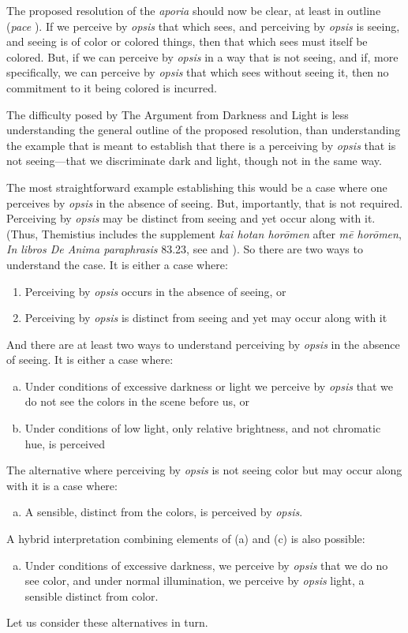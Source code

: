 
The proposed resolution of the \emph{aporia} should now be clear, at least in outline (\emph{pace} \citealt[122]{Hamlyn:2002ys}). If we perceive by \emph{opsis} that which sees, and perceiving by \emph{opsis} is seeing, and seeing is of color or colored things, then that which sees must itself be colored. But, if we can perceive by \emph{opsis} in a way that is not seeing, and if, more specifically, we can perceive by \emph{opsis} that which sees without seeing it, then no commitment to it being colored is incurred.

The difficulty posed by The Argument from Darkness and Light is less understanding the general outline of the proposed resolution, than understanding the example that is meant to establish that there is a perceiving by \emph{opsis} that is not seeing—that we discriminate dark and light, though not in the same way.

The most straightforward example establishing this would be a case where one perceives by \emph{opsis} in the absence of seeing. But, importantly, that is not required. Perceiving by \emph{opsis} may be distinct from seeing and yet occur along with it. (Thus, Themistius includes the supplement \emph{kai hotan horōmen} after \emph{mē horōmen}, \emph{In libros De Anima paraphrasis} 83.23, see \citealt[105, 181 n3]{Todd:1996aa} and \citealt[238]{Browne:1986aa}). So there are two ways to understand the case. It is either a case where:
\begin{enumerate}[(1)]
	\item Perceiving by \emph{opsis} occurs in the absence of seeing, or
	\item Perceiving by \emph{opsis} is distinct from seeing and yet may occur along with it
\end{enumerate}
And there are at least two ways to understand perceiving by \emph{opsis} in the absence of seeing. It is either a case where:
\begin{enumerate}[(a)]
	\item Under conditions of excessive darkness or light we perceive by \emph{opsis} that we do not see the colors in the scene before us, or
	\item Under conditions of low light, only relative brightness, and not chromatic hue, is perceived
\end{enumerate}
The alternative where perceiving by \emph{opsis} is not seeing color but may occur along with it is a case where:
\begin{enumerate}[(c)]
	\item A sensible, distinct from the colors, is perceived by \emph{opsis}.
\end{enumerate}
A hybrid interpretation combining elements of (a) and (c) is also possible:
\begin{enumerate}[(d)]
	\item Under conditions of excessive darkness, we perceive by \emph{opsis} that we do no see color, and under normal illumination, we perceive by \emph{opsis} light, a sensible distinct from color.
\end{enumerate}
Let us consider these alternatives in turn.


